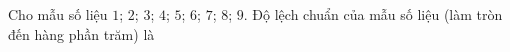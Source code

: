 \begin{ex}
Cho mẫu số liệu $1$; $2$; $3$; $4$; $5$; $6$; $7$; $8$; $9$. Độ lệch chuẩn của mẫu số liệu (làm tròn đến hàng phần trăm) là
\end{ex}
